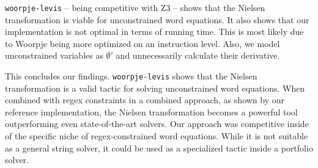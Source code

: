\texttt{woorpje-levis} -- being competitive with Z3 -- shows that the Nielsen transformation is viable for unconstrained word equations. It also shows that our implementation is not optimal in terms of running time. This is most likely due to Woorpje being more optimized on an instruction level. Also, we model unconstrained variables as $\emptyset'$ and unnecessarily calculate their derivative.

This concludes our findings. \texttt{woorpje-levis} shows that the Nielsen transformation is a valid tactic for solving unconstrained word equations. When combined with regex constraints in a combined approach, as shown by our reference implementation, the Nielsen transformation becomes a powerful tool outperforming even state-of-the-art solvers. Our approach was competitive inside of the specific niche of regex-constrained word equations. While it is not suitable as a general string solver, it could be used as a specialized tactic inside a portfolio solver.
